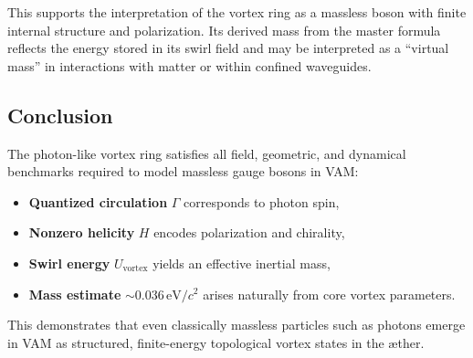 This supports the interpretation of the vortex ring as a massless boson with finite internal structure and polarization. Its derived mass from the master formula reflects the energy stored in its swirl field and may be interpreted as a “virtual mass” in interactions with matter or within confined waveguides.

\subsection{Conclusion}

The photon-like vortex ring satisfies all field, geometric, and dynamical benchmarks required to model massless gauge bosons in VAM:

\begin{itemize}
    \item \textbf{Quantized circulation} $\Gamma$ corresponds to photon spin,
    \item \textbf{Nonzero helicity} $H$ encodes polarization and chirality,
    \item \textbf{Swirl energy} $U_{\text{vortex}}$ yields an effective inertial mass,
    \item \textbf{Mass estimate} \(\sim 0.036 \, \text{eV}/c^2\) arises naturally from core vortex parameters.
\end{itemize}

This demonstrates that even classically massless particles such as photons emerge in VAM as structured, finite-energy topological vortex states in the æther.